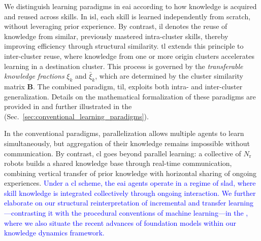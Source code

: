 \documentclass[12pt]{article}
\newcommand\myhl[1]{\textcolor{blue}{#1}}
\renewcommand{\emph}[1]{\textit{#1}}
\begin{document}
We distinguish learning paradigms in \ac{eai} according to how knowledge is acquired and reused across skills. In \ac{isl}, each skill is learned independently from scratch, without leveraging prior experience. By contrast, \ac{il} denotes the reuse of knowledge from similar, previously mastered intra-cluster skills, thereby improving efficiency through structural similarity. \Ac{tl} extends this principle to inter-cluster reuse, where knowledge from one or more origin clusters accelerates learning in a destination cluster. This process is governed by the \emph{transferable knowledge fractions} $\xi_k$ and $\bar{\xi}_k$, which are determined by the cluster similarity matrix $\bm{B}$. The combined paradigm, \ac{til}, exploits both intra- and inter-cluster generalization. Details on the mathematical formalization of these paradigms are provided in  and further illustrated in the  (Sec.~\ref{sec:conventional_learning_paradigms}).

In the conventional paradigms, parallelization allows multiple agents to learn simultaneously, but aggregation of their knowledge remains impossible without communication. By contrast, \acl{cl} goes beyond parallel learning: a collective of $N_\mathrm{r}$ robots builds a shared knowledge base through real-time communication, combining vertical transfer of prior knowledge with horizontal sharing of ongoing experiences. \myhl{Under a \ac{cl} scheme, the \ac{eai} agents operate in a regime of \ac{slad}, where skill knowledge is integrated collectively through ongoing interaction. We further elaborate on our structural reinterpretation of incremental and transfer learning—contrasting it with the procedural conventions of machine learning—in the \nameref{sec:discussion}, where we also situate the recent advances of foundation models within our knowledge dynamics framework.}

\end{document}
